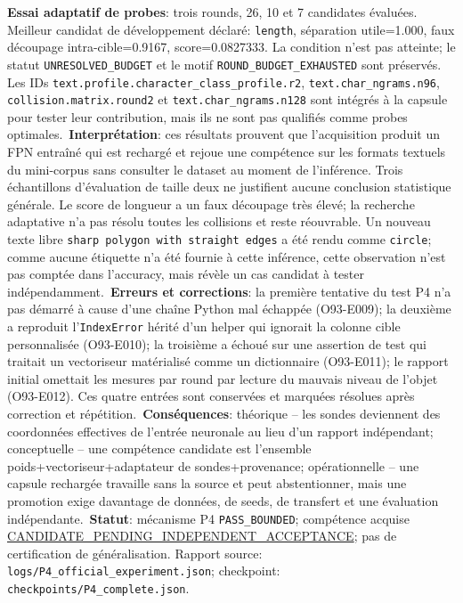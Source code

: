 \documentclass[11pt,a4paper,oneside]{report}
\begin{document}
\textbf{Essai adaptatif de probes}: trois rounds, 26, 10 et 7 candidates évaluées. Meilleur candidat de développement déclaré: \texttt{length}, séparation utile=1.000, faux découpage intra-cible=0.9167, score=0.0827333. La condition n'est pas atteinte; le statut \texttt{UNRESOLVED\_BUDGET} et le motif \texttt{ROUND\_BUDGET\_EXHAUSTED} sont préservés. Les IDs \texttt{text.profile.character\_class\_profile.r2}, \texttt{text.char\_ngrams.n96}, \texttt{collision.matrix.round2} et \texttt{text.char\_ngrams.n128} sont intégrés à la capsule pour tester leur contribution, mais ils ne sont pas qualifiés comme probes optimales.\
\textbf{Interprétation}: ces résultats prouvent que l'acquisition produit un FPN entraîné qui est rechargé et rejoue une compétence sur les formats textuels du mini-corpus sans consulter le dataset au moment de l'inférence. Trois échantillons d'évaluation de taille deux ne justifient aucune conclusion statistique générale. Le score de longueur a un faux découpage très élevé; la recherche adaptative n'a pas résolu toutes les collisions et reste réouvrable. Un nouveau texte libre \texttt{sharp polygon with straight edges} a été rendu comme \texttt{circle}; comme aucune étiquette n'a été fournie à cette inférence, cette observation n'est pas comptée dans l'accuracy, mais révèle un cas candidat à tester indépendamment.\
\textbf{Erreurs et corrections}: la première tentative du test P4 n'a pas démarré à cause d'une chaîne Python mal échappée (O93-E009); la deuxième a reproduit l'\texttt{IndexError} hérité d'un helper qui ignorait la colonne cible personnalisée (O93-E010); la troisième a échoué sur une assertion de test qui traitait un vectoriseur matérialisé comme un dictionnaire (O93-E011); le rapport initial omettait les mesures par round par lecture du mauvais niveau de l'objet (O93-E012). Ces quatre entrées sont conservées et marquées résolues après correction et répétition.\
\textbf{Conséquences}: théorique -- les sondes deviennent des coordonnées effectives de l'entrée neuronale au lieu d'un rapport indépendant; conceptuelle -- une compétence candidate est l'ensemble poids+vectoriseur+adaptateur de sondes+provenance; opérationnelle -- une capsule rechargée travaille sans la source et peut abstentionner, mais une promotion exige davantage de données, de seeds, de transfert et une évaluation indépendante.\
\textbf{Statut}: mécanisme P4 \texttt{PASS\_BOUNDED}; compétence acquise \url{CANDIDATE_PENDING_INDEPENDENT_ACCEPTANCE}; pas de certification de généralisation. Rapport source: \texttt{logs/P4\_official\_experiment.json}; checkpoint: \texttt{checkpoints/P4\_complete.json}.\
\end{document}
